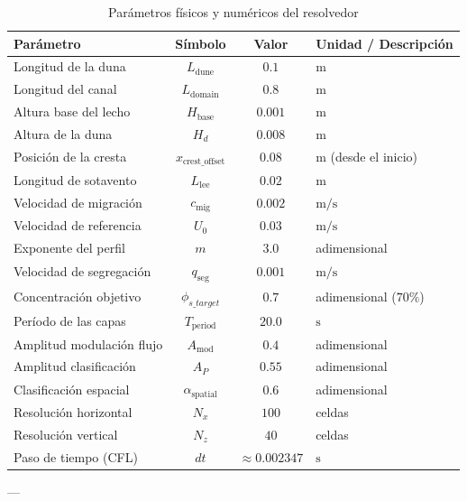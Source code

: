 \documentclass[11pt,a4paper]{article}
\begin{document}
\begin{table}[h!]
\centering
\caption{Parámetros físicos y numéricos del resolvedor}
\vspace{0.2cm}
\begin{tabular}{lccl}
\toprule
\textbf{Parámetro} & \textbf{Símbolo} & \textbf{Valor} & \textbf{Unidad / Descripción} \\
\midrule
Longitud de la duna & $L_{\text{dune}}$ & $0.1$ & $\text{m}$ \\
Longitud del canal & $L_{\text{domain}}$ & $0.8$ & $\text{m}$ \\
Altura base del lecho & $H_{\text{base}}$ & $0.001$ & $\text{m}$ \\
Altura de la duna & $H_d$ & $0.008$ & $\text{m}$ \\
Posición de la cresta & $x_{\text{crest\_offset}}$ & $0.08$ & $\text{m}$ (desde el inicio) \\
Longitud de sotavento & $L_{\text{lee}}$ & $0.02$ & $\text{m}$ \\
Velocidad de migración & $c_{\text{mig}}$ & $0.002$ & $\text{m/s}$ \\
Velocidad de referencia & $U_0$ & $0.03$ & $\text{m/s}$ \\
Exponente del perfil & $m$ & $3.0$ & adimensional \\
Velocidad de segregación & $q_{\text{seg}}$ & $0.001$ & $\text{m/s}$ \\
Concentración objetivo & $\phi_{s\_target}$ & $0.7$ & adimensional ($70\%$) \\
Período de las capas & $T_{\text{period}}$ & $20.0$ & $\text{s}$ \\
Amplitud modulación flujo & $A_{\text{mod}}$ & $0.4$ & adimensional \\
Amplitud clasificación & $A_P$ & $0.55$ & adimensional \\
Clasificación espacial & $\alpha_{\text{spatial}}$ & $0.6$ & adimensional \\
Resolución horizontal & $N_x$ & $100$ & celdas \\
Resolución vertical & $N_z$ & $40$ & celdas \\
Paso de tiempo (CFL) & $dt$ & $\approx 0.002347$ & $\text{s}$ \\
\bottomrule
\end{tabular}
\end{table}

---
\end{document}
